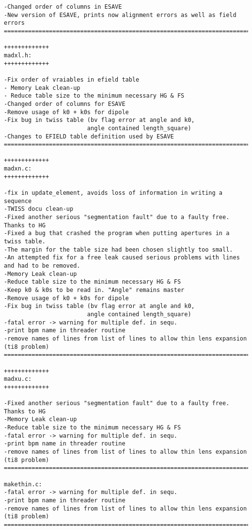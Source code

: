 \begin{verbatim}
-Changed order of columns in ESAVE
-New version of ESAVE, prints now alignment errors as well as field errors
=============================================================================

+++++++++++++
madxl.h:
+++++++++++++

-Fix order of vraiables in efield table
- Memory Leak clean-up
- Reduce table size to the minimum necessary HG & FS
-Changed order of columns for ESAVE
-Remove usage of k0 + k0s for dipole
-Fix bug in twiss table (bv flag error at angle and k0,
                        angle contained length_square)
-Changes to EFIELD table definition used by ESAVE
=============================================================================

+++++++++++++
madxn.c:
+++++++++++++

-fix in update_element, avoids loss of information in writing a sequence
-TWISS docu clean-up
-Fixed another serious "segmentation fault" due to a faulty free. Thanks to HG
-Fixed a bug that crashed the program when putting apertures in a twiss table.
-The margin for the table size had been chosen slightly too small.
-An attempted fix for a free leak caused serious problems with lines and had to be removed.
-Memory Leak clean-up
-Reduce table size to the minimum necessary HG & FS
-Keep k0 & k0s to be read in. "Angle" remains master
-Remove usage of k0 + k0s for dipole
-Fix bug in twiss table (bv flag error at angle and k0,
                        angle contained length_square)
-fatal error -> warning for multiple def. in sequ.
-print bpm name in threader routine
-remove names of lines from list of lines to allow thin lens expansion (ti8 problem)
=============================================================================

+++++++++++++
madxu.c:
+++++++++++++

-Fixed another serious "segmentation fault" due to a faulty free. Thanks to HG
-Memory Leak clean-up
-Reduce table size to the minimum necessary HG & FS
-fatal error -> warning for multiple def. in sequ.
-print bpm name in threader routine
-remove names of lines from list of lines to allow thin lens expansion (ti8 problem)
=============================================================================

makethin.c:
-fatal error -> warning for multiple def. in sequ.
-print bpm name in threader routine
-remove names of lines from list of lines to allow thin lens expansion (ti8 problem)
=============================================================================


\end{verbatim}

